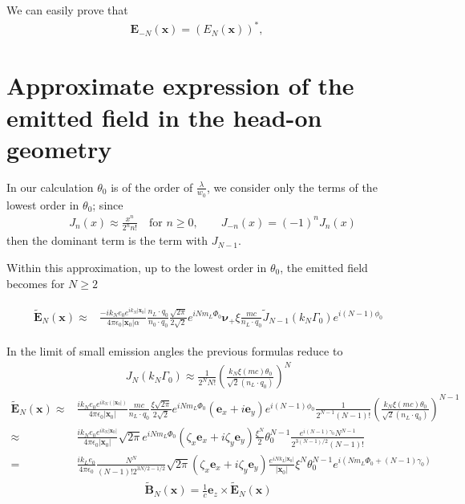 We can easily prove that
\begin{align}
  {\bm E}_{-N}({\bm x}) = (E_N({\bm x}))^*,\qquad
\end{align}

\section{Approximate expression of the emitted field in the head-on geometry}

In our calculation $\theta_0$ is of the order of $\frac{\lambda}{w_0}$, we consider only the terms of the lowest order in $\theta_0$; since
\begin{align}
  & J_n(x)\approx \frac{x^n}{2^n n!}\quad {\text{for   }}n\ge0 ,\qquad J_{-n}(x)=(-1)^n J_n(x)
\end{align}
then the dominant term is the term with $J_{N-1}$.

Within this approximation, up to the lowest order in  $\theta_0$, the emitted field becomes for $N\ge2$

\begin{align}
  \boxed{
    \begin{aligned}
      \tilde{\bm E}_N({\bm x}) \approx & \frac{-i k_N  e_0 e^{ik_N |{\bm x}_0|}}{4\pi\epsilon_0|{\bm x}_0|\alpha}\frac{n_L\cdot q_0}{n_0\cdot q_0}\frac{\sqrt{2\pi}}{2\sqrt{2}}e^{iNm_L\varPhi_0}{\boldsymbol{\nu}}_{+}\xi\frac{mc}{n_L\cdot q_0}\tilde J_{N-1}(k_N\Gamma_0)e^{i(N-1)\phi_0}
    \end{aligned}
  }
\end{align}

In the limit of small emission angles the previous formulas reduce to
\begin{align}
  J_N(k_N\Gamma_0) \approx  \frac{1}{2^N N!}\left(\frac{k_N\xi (mc)\theta_0}{\sqrt{2}(n_L\cdot q_0)}\right)^N
\end{align}
\begin{align}
  \tilde{\bm E}_N({\bm x}) \approx & \frac{i k_N  e_0 e^{ik_N (|{\bm x}_0|)}}{4\pi\epsilon_0|{\bm x}_0|}\frac{mc}{n_L\cdot q_0}\frac{\xi\sqrt{2\pi}}{2\sqrt{2}}e^{iNm_L\varPhi_0}\left({\bm e}_x+i{\bm e}_y\right)e^{i(N-1)\phi_0}\frac{1}{2^{N-1} (N-1)!}\left(\frac{k_N\xi (mc)\theta_0}{\sqrt{2}(n_L\cdot q_0)}\right)^{N-1}\nonumber\\
  \approx                          & \frac{i k_N  e_0 e^{ik_N |{\bm x}_0|}}{4\pi\epsilon_0|{\bm x}_0|}{\sqrt{2\pi}}e^{iNm_L\varPhi_0}\left(\zeta_x{\bm e}_x+i\zeta_y{\bm e}_y\right)\frac{\xi^N}2 \theta_0^{N-1}\frac{e^{i(N-1)\gamma_0}N^{N-1}}{2^{3(N-1)/2}(N-1)!}\nonumber \\
  =                                & \frac{i k_L  e_0}{4\pi\epsilon_0}\frac{N^N}{(N-1)!2^{3N/2-1/2}}\sqrt{2\pi}(\zeta_x{\bm e}_x+i \zeta_y{\bm e}_y)\frac{e^{iNk_L|{\bm x}_0|}}{|{\bm x}_0|}\xi^N\theta_0^{N-1}e^{i(Nm_L\varPhi_0+(N-1)\gamma_0)}\label{approx-e-n-circ}
\end{align}
\begin{align}
  \tilde{\bm B}_N({\bm x})= \frac1c{\bm e}_z\times\tilde{\bm E}_N({\bm x})
\end{align}

